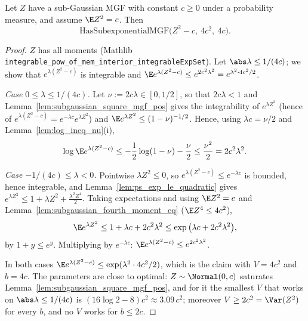 \begin{lemma}
\label{lem:subgaussian_square_subexp}
\leanok
{}
Let $Z$ have a sub-Gaussian MGF with constant $c \ge 0$ under a probability measure, and
assume $\E Z^2 = c$. Then
\[
  \mathrm{HasSubexponentialMGF}\big(Z^2 - c,\ 4c^2,\ 4c\big).
\]
\end{lemma}

\begin{proof}
\leanok
{}
$Z$ has all moments (Mathlib \texttt{integrable\_pow\_of\_mem\_interior\_integrableExpSet}).
Let $\abs\lambda \le 1/(4c)$; we show that $e^{\lambda(Z^2 - c)}$ is integrable and
$\E e^{\lambda(Z^2 - c)} \le e^{2c^2\lambda^2} = e^{\lambda^2\cdot4c^2/2}$.

\emph{Case $0 \le \lambda \le 1/(4c)$.} Let $\nu := 2c\lambda \in [0, 1/2]$, so that
$2c\lambda < 1$ and Lemma~\ref{lem:subgaussian_square_mgf_pos} gives the integrability of
$e^{\lambda Z^2}$ (hence of $e^{\lambda(Z^2-c)} = e^{-\lambda c}e^{\lambda Z^2}$) and
$\E e^{\lambda Z^2} \le (1-\nu)^{-1/2}$. Hence, using $\lambda c = \nu/2$ and
Lemma~\ref{lem:log_ineq_nu}(i),
\[
  \log\E e^{\lambda(Z^2 - c)} \le -\frac12\log(1-\nu) - \frac{\nu}{2} \le \frac{\nu^2}{2} = 2c^2\lambda^2 .
\]

\emph{Case $-1/(4c) \le \lambda < 0$.} Pointwise $\lambda Z^2 \le 0$, so
$e^{\lambda(Z^2-c)} \le e^{-\lambda c}$ is bounded, hence integrable, and
Lemma~\ref{lem:ps_exp_le_quadratic} gives $e^{\lambda Z^2} \le 1 + \lambda Z^2 + \frac{\lambda^2Z^4}{2}$.
Taking expectations and using $\E Z^2 = c$ and Lemma~\ref{lem:subgaussian_fourth_moment_eq}
($\E Z^4 \le 4c^2$),
\[
  \E e^{\lambda Z^2} \le 1 + \lambda c + 2c^2\lambda^2
  \le \exp\big(\lambda c + 2c^2\lambda^2\big),
\]
by $1 + y \le e^y$. Multiplying by $e^{-\lambda c}$:
$\E e^{\lambda(Z^2 - c)} \le e^{2c^2\lambda^2}$.

In both cases $\E e^{\lambda(Z^2-c)} \le \exp(\lambda^2\cdot4c^2/2)$, which is the claim with
$V = 4c^2$ and $b = 4c$. The parameters are close to optimal: $Z \sim \Normal(0,c)$ saturates
Lemma~\ref{lem:subgaussian_square_mgf_pos}, and for it the smallest $V$ that works on
$\abs\lambda \le 1/(4c)$ is $(16\log2-8)c^2 \approx 3.09\,c^2$; moreover $V \ge 2c^2 = \Var(Z^2)$
for every $b$, and no $V$ works for $b \le 2c$.
\end{proof}

